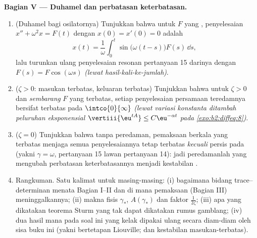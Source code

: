 \begin{problem}
\medskip
\noindent\textbf{Bagian V --- Duhamel dan perbatasan
keterbatasan.}
\begin{enumerate}[resume]
  \item (Duhamel bagi osilatornya) Tunjukkan bahwa untuk
        $F$ yang , penyelesaian $x'' + \omega^2x =
        F(t)$ dengan $x(0) = x'(0) = 0$ adalah
        \[
        x(t) = \frac1\omega\int_0^t\sin\bigl(\omega(t -
        s)\bigr)F(s)\,\dd s ,
        \]
        lalu turunkan ulang penyelesaian resonan pertanyaan 15
        darinya dengan $F(s) = F\cos(\omega s)$
        \emph{(lewat hasil-kali-ke-jumlah)}.
  \item ($\zeta > 0$: masukan terbatas, keluaran terbatas) Tunjukkan
        bahwa untuk $\zeta > 0$ dan \emph{sembarang} $F$ 
        yang terbatas, setiap penyelesaian persamaan teredamnya bersifat terbatas
        pada $\intco{0}{\infty}$ \emph{(lewat variasi konstanta
        ditambah peluruhan eksponensial $\vertiii{\eu^{tA}} \leq
        C\eu^{-\alpha t}$ pada \cref{exo:b2:diffeq:8})}.
  \item ($\zeta = 0$) Tunjukkan bahwa tanpa peredaman, pemaksaan
        berkala yang terbatas menjaga semua penyelesaiannya tetap terbatas
        \emph{kecuali} persis pada  (yakni $\gamma =
        \omega$, pertanyaan 15 lawan pertanyaan 14): jadi peredamanlah
        yang mengubah perbatasan keterbatasannya menjadi kestabilan .
  \item Rangkuman. Satu kalimat untuk masing-masing: (i) bagaimana
        bidang trace--determinan menata Bagian I--II dan
        di mana pemaksaan (Bagian III) meninggalkannya; (ii) makna
        fisis $\gamma_*$, $A(\gamma_*)$ dan
        faktor $\frac1{2\zeta}$; (iii) apa yang dikatakan teorema
        Sturm yang tak dapat dikatakan rumus gamblang; (iv)
        dua hasil mana pada soal ini yang kelak dipakai ulang secara diam-diam
        oleh sisa buku ini (yakni  bertetapan Liouville;
        dan kestabilan masukan-terbatas).

\end{enumerate}
\end{problem}
